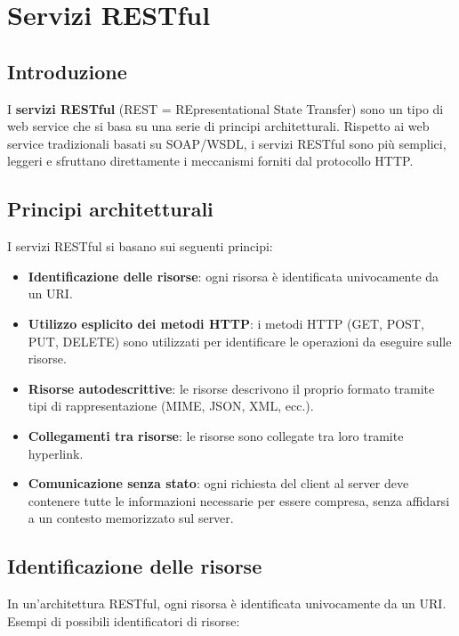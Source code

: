 \chapter{Servizi RESTful}

\section{Introduzione}

I \textbf{servizi RESTful} (REST = REpresentational State Transfer) sono un tipo di web service che si basa su una serie di principi architetturali. Rispetto ai web service tradizionali basati su SOAP/WSDL, i servizi RESTful sono più semplici, leggeri e sfruttano direttamente i meccanismi forniti dal protocollo HTTP.

\section{Principi architetturali}

I servizi RESTful si basano sui seguenti principi:

\begin{itemize}
    \item \textbf{Identificazione delle risorse}: ogni risorsa è identificata univocamente da un URI.
    \item \textbf{Utilizzo esplicito dei metodi HTTP}: i metodi HTTP (GET, POST, PUT, DELETE) sono utilizzati per identificare le operazioni da eseguire sulle risorse.
    \item \textbf{Risorse autodescrittive}: le risorse descrivono il proprio formato tramite tipi di rappresentazione (MIME, JSON, XML, ecc.).
    \item \textbf{Collegamenti tra risorse}: le risorse sono collegate tra loro tramite hyperlink.
    \item \textbf{Comunicazione senza stato}: ogni richiesta del client al server deve contenere tutte le informazioni necessarie per essere compresa, senza affidarsi a un contesto memorizzato sul server.
\end{itemize}

\section{Identificazione delle risorse}

In un'architettura RESTful, ogni risorsa è identificata univocamente da un URI. Esempi di possibili identificatori di risorse:

